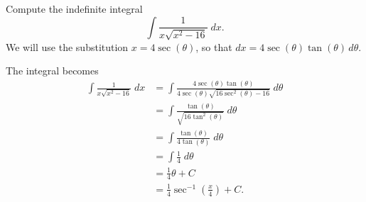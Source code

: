 \documentclass{ximera}
\begin{document}
\begin{example}[example 6]
Compute the indefinite integral
\[
\int \frac{1}{x\sqrt{x^2-16}} \; dx.
\]
We will use the substitution $x = 4\sec(\theta)$,
so that $dx = 4\sec(\theta)\tan(\theta) \, d\theta$.

The integral becomes
\begin{align*}
\int \frac{1}{x\sqrt{x^2-16}}\; dx &= \int \frac{4\sec(\theta)\tan(\theta)}{4\sec(\theta)\sqrt{16\sec^2(\theta)-16}}\; d\theta\\[6pt]
                                 &=  \int \frac{\tan(\theta)}{\sqrt{16\tan^2(\theta)}}\; d\theta\\[6pt]
                                 &=  \int \frac{\tan(\theta)}{4\tan(\theta)}\; d\theta\\[6pt]
                                  &=  \int \frac14 \; d\theta\\[6pt]
                                  &= \frac14 \theta + C\\[6pt]
                                  &= \frac14 \sec^{-1}\left(\frac{x}{4}\right)+C.
\end{align*}

\end{example}
\end{document}
